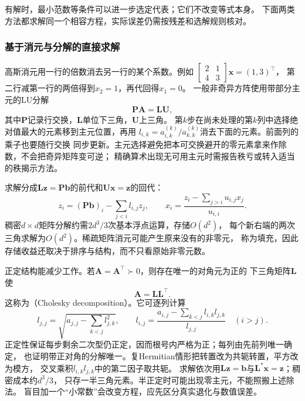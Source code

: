 有解时，最小范数等条件可以进一步选定代表；它们不改变等式本身。
下面两类方法都求解同一个相容方程，实际误差仍需按残差和选解规则核对。

\subsubsection{基于消元与分解的直接求解}
\label{sec:linear-algebra-direct-exact}
\label{sec:matrix-analysis-stable-solvers}

\label{sec:matrix-analysis-blocks-updates}


高斯消元用一行的倍数消去另一行的某个系数。例如
$\left[\begin{smallmatrix}2&1\\4&3\end{smallmatrix}\right]\bm x=(1,3)^\top$，
第二行减第一行的两倍得到$x_2=1$，再代回得$x_1=0$。
一般非奇异方阵使用带部分主元的LU分解
\begin{equation}
 \bm P\bm A=\bm L\bm U,
 \label{eq:matrix-analysis-palu}
\end{equation}
其中$\bm P$记录行交换，$\bm L$单位下三角，$\bm U$上三角。
第$k$步在尚未处理的第$k$列中选择绝对值最大的元素移到主元位置，再用
$l_{i,k}=a^{(k)}_{i,k}/a^{(k)}_{k,k}$消去下面的元素。前面列的乘子也要随行交换
同步更新。主元选择避免把本可交换避开的零元素拿来作除数，不会把奇异矩阵变可逆；
精确算术出现无可用主元时需报告秩亏或转入适当的秩揭示方法。

求解分成$\bm L\bm z=\bm P\bm b$的前代和$\bm U\bm x=\bm z$的回代：
\[
 z_i=(\bm P\bm b)_i-\sum_{j<i}l_{i,j}z_j,\qquad
 x_i=\frac{z_i-\sum_{j>i}u_{i,j}x_j}{u_{i,i}}.
\]
稠密$d\times d$矩阵分解约需$2d^3/3$次基本浮点运算，存储$O(d^2)$，
每个新右端的两次三角求解为$O(d^2)$。稀疏矩阵消元可能产生原来没有的非零元，
称为填充，因此存储收益还取决于排序与结构，而不只看原始非零元数。

正定结构能减少工作。若$\bm A=\bm A^\top\succ0$，则存在唯一的对角元为正的
下三角矩阵$\bm L$使
\begin{equation}
 \bm A=\bm L\bm L^\top.
 \label{eq:matrix-analysis-cholesky}
\end{equation}
这称为（Cholesky decomposition）。它可逐列计算
\[
 l_{j,j}=\sqrt{a_{j,j}-\sum_{k<j}l_{j,k}^2},\qquad
 l_{i,j}=\frac{a_{i,j}-\sum_{k<j}l_{i,k}l_{j,k}}{l_{j,j}}\quad(i>j).
\]
正定性保证每步剩余二次型仍正定，因而根号内严格为正；每列由先前列唯一确定，
也证明带正对角的分解唯一。复Hermitian情形把转置改为共轭转置，平方改为模方，
交叉乘积$l_{i,k}l_{j,k}$中的第二因子取共轭。
求解依次用$\bm L\bm z=\bm b$与$\bm L^*\bm x=\bm z$；稠密成本约$d^3/3$，
只存一半三角元素。半正定时可能出现零主元，不能照搬上述除法。
盲目加一个“小常数”会改变方程，应先区分真实退化与数值误差。


